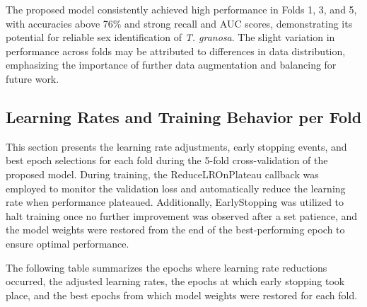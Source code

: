 \begin{table}[H]
	\centering
	\caption{Per-Fold Performance Metrics (Batch Size: 32, Epochs: 50, Activation Function: ReLU)}
	\label{tab:per-fold}
\end{table}

The proposed model consistently achieved high performance in Folds 1, 3, and 5, with accuracies above 76\% and strong recall and AUC scores, demonstrating its potential for reliable sex identification of \textit{T. granosa}. The slight variation in performance across folds may be attributed to differences in data distribution, emphasizing the importance of further data augmentation and balancing for future work.

\subsection{Learning Rates and Training Behavior per Fold}
This section presents the learning rate adjustments, early stopping events, and best epoch selections for each fold during the 5-fold cross-validation of the proposed model. During training, the ReduceLROnPlateau callback was employed to monitor the validation loss and automatically reduce the learning rate when performance plateaued. Additionally, EarlyStopping was utilized to halt training once no further improvement was observed after a set patience, and the model weights were restored from the end of the best-performing epoch to ensure optimal performance.

The following table summarizes the epochs where learning rate reductions occurred, the adjusted learning rates, the epochs at which early stopping took place, and the best epochs from which model weights were restored for each fold.

